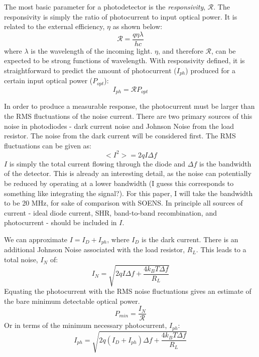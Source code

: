 \documentclass[onecolumn]{article}
\begin{document}
The most basic parameter for a photodetector is the \textit{responsivity}, $\mathcal{R}$. The responsivity is simply the ratio of photocurrent to input optical power. It is related to the external efficiency, $\eta$ as shown below:
\begin{equation}
    \mathcal{R} = \frac{q\eta\lambda}{hc}
\end{equation}
where $\lambda$ is the wavelength of the incoming light. $\eta$, and therefore $\mathcal{R}$, can be expected to be strong functions of wavelength. With responsivity defined, it is straightforward to predict the amount of photocurrent ($I_{ph}$) produced for a certain input optical power ($P_{opt}$):
\begin{equation}
    I_{ph} = \mathcal{R}P_{opt}
\end{equation}

In order to produce a measurable response, the photocurrent must be larger than the RMS fluctuations of the noise current. There are two primary sources of this noise in photodiodes - dark current noise and Johnson Noise from the load resistor. The noise from the dark current will be considered first. The RMS fluctuations can be given as:
\begin{equation}
    <I^{2}> = 2qI\Delta f
\end{equation}
$I$ is simply the total current flowing through the diode and $\Delta f$ is the bandwidth of the detector. This is already an interesting detail, as the noise can potentially be reduced by operating at a lower bandwidth (I guess this corresponds to something like integrating the signal?). For this paper, I will take the bandwidth to be 20 MHz, for sake of comparison with SOENS. In principle all sources of current - ideal diode current, SHR, band-to-band recombination, and photocurrent - should be included in $I$. 

We can approximate $I = I_{D} + I_{ph}$, where $I_{D}$ is the dark current. There is an additional Johnson Noise associated with the load resistor, $R_{L}$. This leads to a total noise, $I_{N}$ of:
\begin{equation}
    I_{N} = \sqrt{2qI\Delta f + \frac{4k_{B}T\Delta f}{R_{L}}}
\end{equation}
Equating the photocurrent with the RMS noise fluctuations gives an estimate of the bare minimum detectable optical power.
\begin{equation}
    P_{min} = \frac{I_N}{\mathcal{R}}
\end{equation}
Or in terms of the minimum necessary photocurrent, $I_{ph}$:
\begin{equation}
    I_{ph} = \sqrt{2q(I_D+I_{ph})\Delta f + \frac{4k_{B}T\Delta f}{R_{L}}
    }
\end{equation}
\end{document}
